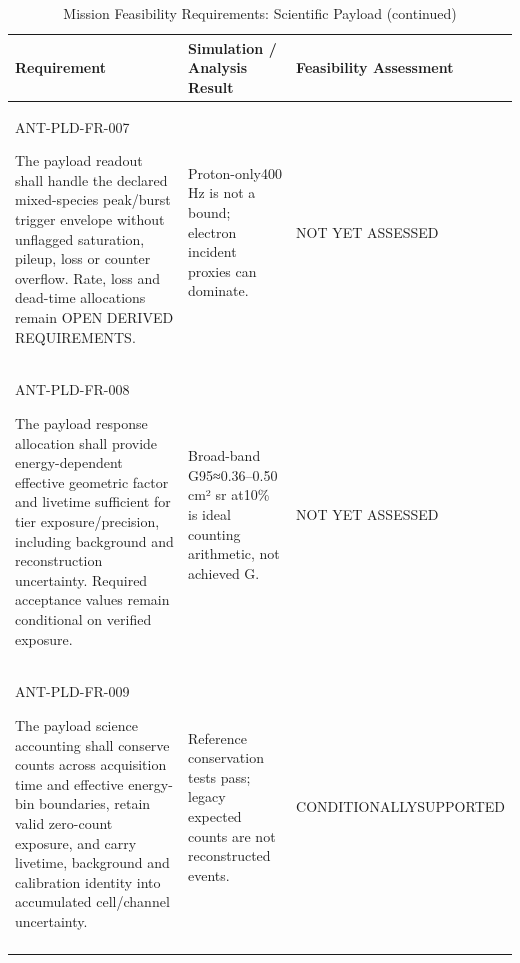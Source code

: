 \begin{table}[H]\centering\small\setlength{\tabcolsep}{3pt}
\ContinuedFloat\captionsetup{list=no}
\caption{Mission Feasibility Requirements: Scientific Payload (continued)}
\begin{tabular}{@{}
>{\RaggedRight\arraybackslash}p{}
>{\RaggedRight\arraybackslash}p{}
>{\RaggedRight\arraybackslash}p{}
@{}}
\toprule Requirement & Simulation / Analysis Result & Feasibility Assessment\\\midrule
{}\label{req:ANT-PLD-FR-007}\mbox{ANT-PLD-}\newline\mbox{FR-007}\par The payload readout shall handle the declared mixed-species peak/burst trigger envelope without unflagged saturation, pileup, loss or counter overflow. Rate, loss and dead-time allocations remain OPEN DERIVED REQUIREMENTS. & Proton-only400 Hz is not a bound; electron incident proxies can dominate. & NOT YET ASSESSED\\
\addlinespace[3pt]
\label{req:ANT-PLD-FR-008}\mbox{ANT-PLD-}\newline\mbox{FR-008}\par The payload response allocation shall provide energy-dependent effective geometric factor and livetime sufficient for tier exposure/precision, including background and reconstruction uncertainty. Required acceptance values remain conditional on verified exposure. & Broad-band G95≈0.36–0.50 cm² sr at10\% is ideal counting arithmetic, not achieved G. & NOT YET ASSESSED\\
\addlinespace[3pt]
\label{req:ANT-PLD-FR-009}\mbox{ANT-PLD-}\newline\mbox{FR-009}\par The payload science accounting shall conserve counts across acquisition time and effective energy-bin boundaries, retain valid zero-count exposure, and carry livetime, background and calibration identity into accumulated cell/channel uncertainty. & Reference conservation tests pass; legacy expected counts are not reconstructed events. & CONDITIONALLY\newline SUPPORTED\\
\addlinespace[3pt]
\bottomrule
\end{tabular}
\end{table}
